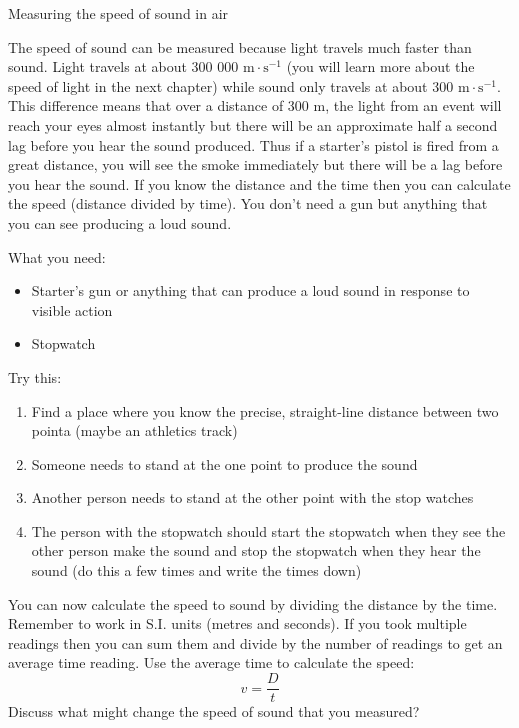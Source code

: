\begin{i_experiment}{Measuring the speed of sound in air}

The speed of sound can be measured because light travels much faster than sound. Light travels at about 300 000 $\text{m}\cdot\text{s}^{-1}$ (you will learn more about the speed of light in the next chapter) while sound only travels at about 300 $\text{m}\cdot\text{s}^{-1}$.  This difference means that over a distance of 300 $\text{m}$, the light from an event will reach your eyes almost instantly but there will be an approximate half a second lag before you hear the sound produced.  Thus if a starter's pistol is fired from a great distance, you will see the smoke immediately but there will be a lag before you hear the sound.  If you know the distance and the time then you can calculate the speed (distance divided by time). You don't need a gun but anything that you can see producing a loud sound.

What you need:
\begin{itemize}
 \item Starter's gun or anything that can produce a loud sound in response to visible action
  \item Stopwatch
  \end{itemize}

Try this:
\begin{enumerate}[noitemsep, label=\textbf{\arabic*}. ] 
\item Find a place where you know the precise, straight-line distance between two pointa (maybe an athletics track)
\item Someone needs to stand at the one point to produce the sound 
\item Another person needs to stand at the other point with the stop watches
\item The person with the stopwatch should start the stopwatch when they see the other person make the sound and stop the stopwatch when they hear the sound (do this a few times and write the times down)
\end{enumerate}

You can now calculate the speed to sound by dividing the distance by the time. Remember to work in S.I. units (metres and seconds). If you took multiple readings then you can sum them and divide by the number of readings to get an average time reading. Use the average time to calculate the speed:
\begin{equation*}
 v = \frac{D}{t}
\end{equation*}
Discuss what might change the speed of sound that you measured? 
\end{i_experiment}

